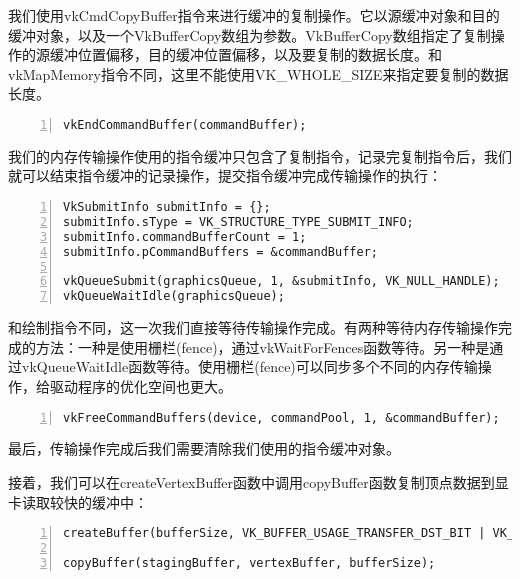 \documentclass{ctexart}
\begin{document}
我们使用vkCmdCopyBuffer指令来进行缓冲的复制操作。它以源缓冲对象和目的缓冲对象，以及一个VkBufferCopy数组为参数。VkBufferCopy数组指定了复制操作的源缓冲位置偏移，目的缓冲位置偏移，以及要复制的数据长度。和vkMapMemory指令不同，这里不能使用VK\_WHOLE\_SIZE来指定要复制的数据长度。

\begin{lstlisting}[language={[ANSI]C},keywordstyle=\color{blue!70},commentstyle=\color{red!50!green!50!blue!50},frame=shadowbox, rulesepcolor=\color{red!20!green!20!blue!20},basicstyle=\small,numbers=left, numberstyle=\tiny,breaklines=true]
vkEndCommandBuffer(commandBuffer);
\end{lstlisting}

我们的内存传输操作使用的指令缓冲只包含了复制指令，记录完复制指令后，我们就可以结束指令缓冲的记录操作，提交指令缓冲完成传输操作的执行：

\begin{lstlisting}[language={[ANSI]C},keywordstyle=\color{blue!70},commentstyle=\color{red!50!green!50!blue!50},frame=shadowbox, rulesepcolor=\color{red!20!green!20!blue!20},basicstyle=\small,numbers=left, numberstyle=\tiny,breaklines=true]
VkSubmitInfo submitInfo = {};
submitInfo.sType = VK_STRUCTURE_TYPE_SUBMIT_INFO;
submitInfo.commandBufferCount = 1;
submitInfo.pCommandBuffers = &commandBuffer;

vkQueueSubmit(graphicsQueue, 1, &submitInfo, VK_NULL_HANDLE);
vkQueueWaitIdle(graphicsQueue);
\end{lstlisting}

和绘制指令不同，这一次我们直接等待传输操作完成。有两种等待内存传输操作完成的方法：一种是使用栅栏(fence)，通过vkWaitForFences函数等待。另一种是通过vkQueueWaitIdle函数等待。使用栅栏(fence)可以同步多个不同的内存传输操作，给驱动程序的优化空间也更大。

\begin{lstlisting}[language={[ANSI]C},keywordstyle=\color{blue!70},commentstyle=\color{red!50!green!50!blue!50},frame=shadowbox, rulesepcolor=\color{red!20!green!20!blue!20},basicstyle=\small,numbers=left, numberstyle=\tiny,breaklines=true]
vkFreeCommandBuffers(device, commandPool, 1, &commandBuffer);
\end{lstlisting}

最后，传输操作完成后我们需要清除我们使用的指令缓冲对象。

接着，我们可以在createVertexBuffer函数中调用copyBuffer函数复制顶点数据到显卡读取较快的缓冲中：

\begin{lstlisting}[language={[ANSI]C},keywordstyle=\color{blue!70},commentstyle=\color{red!50!green!50!blue!50},frame=shadowbox, rulesepcolor=\color{red!20!green!20!blue!20},basicstyle=\small,numbers=left, numberstyle=\tiny,breaklines=true]
createBuffer(bufferSize, VK_BUFFER_USAGE_TRANSFER_DST_BIT | VK_BUFFER_USAGE_VERTEX_BUFFER_BIT, VK_MEMORY_PROPERTY_DEVICE_LOCAL_BIT, vertexBuffer, vertexBufferMemory);

copyBuffer(stagingBuffer, vertexBuffer, bufferSize);
\end{lstlisting}
\end{document}
